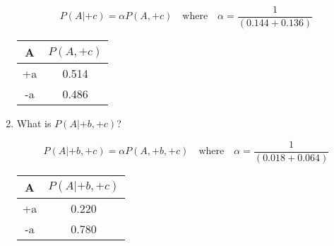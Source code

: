 \documentclass[12pt]{article}
\begin{document}
\begin{enumerate}

  \[
    P(A|+c) = \alpha P(A,+c) \quad \text{where} \quad \alpha = \frac{1}{(0.144+0.136)}
  \]

  \begin{center}
  \begin{tabular}{|c|c|} \hline
  A  & $P(A,+c)$ \\ \hline
  +a & 0.514 \\ \hline
  -a & 0.486 \\ \hline
  \end{tabular}
  \end{center}


  \item What is $P(A|+b,+c)$?

  \[
    P(A|+b,+c) = \alpha P(A,+b,+c) \quad \text{where} \quad \alpha = \frac{1}{(0.018 + 0.064)}
  \]

  \begin{center}
  \begin{tabular}{|c|c|} \hline
  A  & $P(A|+b,+c)$ \\ \hline
  +a & 0.220 \\ \hline
  -a & 0.780 \\ \hline
  \end{tabular}
  \end{center}
  \end{enumerate}

\end{document}
